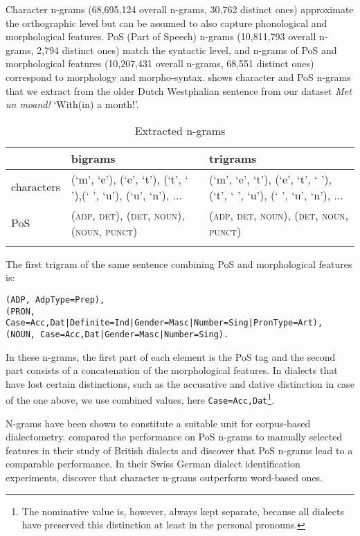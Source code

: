 \documentclass[output=paper,colorlinks,citecolor=brown]{langscibook}
\begin{document}
Character n-grams (68,695,124 overall n-grams, 30,762 distinct ones) approximate the orthographic level but can be assumed to also capture phonological and morphological features. PoS (Part of Speech) n-grams (10,811,793 overall n-grams, 2,794 distinct ones) match the syntactic level, and n-grams of PoS and morphological features (10,207,431 overall n-grams, 68,551 distinct ones) correspond to morphology and morpho-syntax.  shows character and PoS n-grams that we extract from the older Dutch Westphalian sentence from our dataset \textit{Met un moand!} `With(in) a month!'. 

\begin{table}
\caption{Extracted n-grams}
\label{tab:extracted_n-grams}
 \begin{tabularx}{\textwidth}{lQQ}
  \lsptoprule
  & bigrams & trigrams \\
  \midrule
  characters & (`m', `e'), (`e', `t'), (`t', ` '),\linebreak (` ', `u'), (`u', `n'), ... & (`m', `e', `t'), (`e', `t', ` '),\linebreak (`t', ` ', `u'), (` ', `u', `n'), ...\\
  PoS &  (\textsc{adp}, \textsc{det}), (\textsc{det}, \textsc{noun}), (\textsc{noun}, \textsc{punct}) & (\textsc{adp}, \textsc{det}, \textsc{noun}), (\textsc{det}, \textsc{noun}, \textsc{punct})\\
  \lspbottomrule
 \end{tabularx}
\end{table}

The first trigram of the same sentence combining PoS and morphological features is:

\begin{lstlisting}
(ADP, AdpType=Prep),
(PRON, Case=Acc,Dat|Definite=Ind|Gender=Masc|Number=Sing|PronType=Art), 
(NOUN, Case=Acc,Dat|Gender=Masc|Number=Sing).
\end{lstlisting}

In these n-grams, the first part of each element is the PoS tag and the second part consists of a concatenation of the morphological features. In dialects that have lost certain distinctions, such as the accusative and dative distinction in case of the one above, we use combined values, here \texttt{Case=Acc,Dat}\footnote{The nominative value is, however, always kept separate, because all dialects have preserved this distinction at least in the personal pronouns.}. 

N-grams have been shown to constitute a suitable unit for corpus-based dialectometry. \citet{WolkSzmrecsanyi2016} compared the performance on PoS n-grams to manually selected features in their study of British dialects and discover that PoS n-grams lead to a comparable performance. In their Swiss German dialect identification experiments,  \citet{MalmasiZampieri2017} discover that character n-grams outperform word-based ones. 
\end{document}
